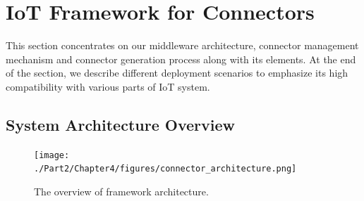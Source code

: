  
\section{IoT Framework for Connectors}
This section concentrates on our middleware architecture, connector management mechanism and connector generation process along with its elements. At the end of the section, we describe different deployment scenarios to emphasize its high compatibility with various parts of IoT system.

\subsection{System Architecture Overview}

\begin{figure}[h!] 
 \begin{center} 
 \texttt{[image: ./Part2/Chapter4/figures/connector\_architecture.png]} 
    \caption{The overview of framework architecture.}
     \label{fig:c4_overview_architecture}
  \end{center} 
\end{figure}

